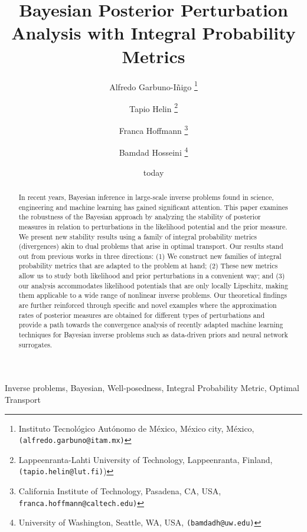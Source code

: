 \documentclass[final]{siamart171218}
\title{Bayesian Posterior Perturbation Analysis with Integral 
Probability Metrics}
\author{Alfredo Garbuno-I{\~n}igo
\thanks{Instituto Tecnol{\'o}gico Aut{\'o}nomo de M{\'e}xico, M{\'e}xico city, M{\'e}xico, \texttt{(alfredo.garbuno@itam.mx)}} \and
 Tapio Helin 
 \thanks{Lappeenranta-Lahti University of Technology, Lappeenranta, Finland, \texttt{(tapio.helin@lut.fi)}) } \and
 Franca Hoffmann 
 \thanks{California Institute of Technology, Pasadena, CA, USA, \texttt{franca.hoffmann@caltech.edu)}} \and 
 Bamdad Hosseini 
 \thanks{University of Washington, Seattle, WA, USA, \texttt{(bamdadh@uw.edu)}}
 }
\begin{document}
\date{today}
\maketitle


\begin{abstract}
In recent years, Bayesian inference in large-scale inverse problems found in science, engineering and machine learning has gained significant attention. This paper examines the robustness of the Bayesian approach by analyzing the stability of posterior measures in relation to perturbations in the likelihood potential and the prior measure.  We present new stability results using a family of integral probability metrics (divergences) akin to dual problems that arise in optimal transport. 
Our results stand out from previous works 
in three directions: (1) We construct new families of integral probability metrics
that are adapted to the problem at hand; (2) These new metrics allow us to 
study both likelihood and prior perturbations in a convenient way; and (3) 
our analysis accommodates 
likelihood potentials that are only locally Lipschitz, making them applicable to a wide range of nonlinear inverse problems. Our theoretical findings are further reinforced through specific and novel examples where the approximation rates of posterior measures are obtained for different types of 
 perturbations and provide a path towards the convergence analysis of recently adapted 
machine learning techniques for Bayesian inverse problems such as 
data-driven priors and neural network surrogates.
\end{abstract}

\begin{keywords}
Inverse problems, Bayesian, Well-posedness, Integral Probability Metric, Optimal Transport
\end{keywords}



\end{document}

